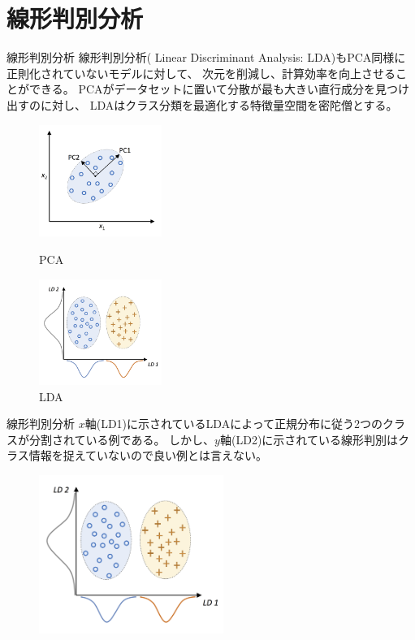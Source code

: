 \documentclass[aspectratio=169, dvipdfmx, 11pt]{beamer} %
\begin{document}
\section{線形判別分析}
\begin{frame}{線形判別分析}
    線形判別分析( Linear Discriminant Analysis: LDA)もPCA同様に正則化されていないモデルに対して、
    次元を削減し、計算効率を向上させることができる。
    PCAがデータセットに置いて分散が最も大きい直行成分を見つけ出すのに対し、
    LDAはクラス分類を最適化する特徴量空間を密陀僧とする。
    \begin{figure}[h]
        \begin{minipage}[b]{0.45\linewidth}
            \centering
            \includegraphics[width=40mm]{img/day05/fig01.png}
            \caption*{PCA}
        \end{minipage}
        \begin{minipage}[b]{0.45\linewidth}
            \centering
            \includegraphics[width=40mm]{img/day05/fig02.png}
            \caption*{LDA}
        \end{minipage}
    \end{figure}
\end{frame}

\begin{frame}{線形判別分析}
    \(x\)軸(LD1)に示されているLDAによって正規分布に従う2つのクラスが分割されている例である。
    しかし、\(y\)軸(LD2)に示されている線形判別はクラス情報を捉えていないので良い例とは言えない。
    \begin{figure}[h]
        \centering
        \includegraphics[width=60mm]{img/day05/fig02.png}
    \end{figure}
\end{frame}
\end{document}
